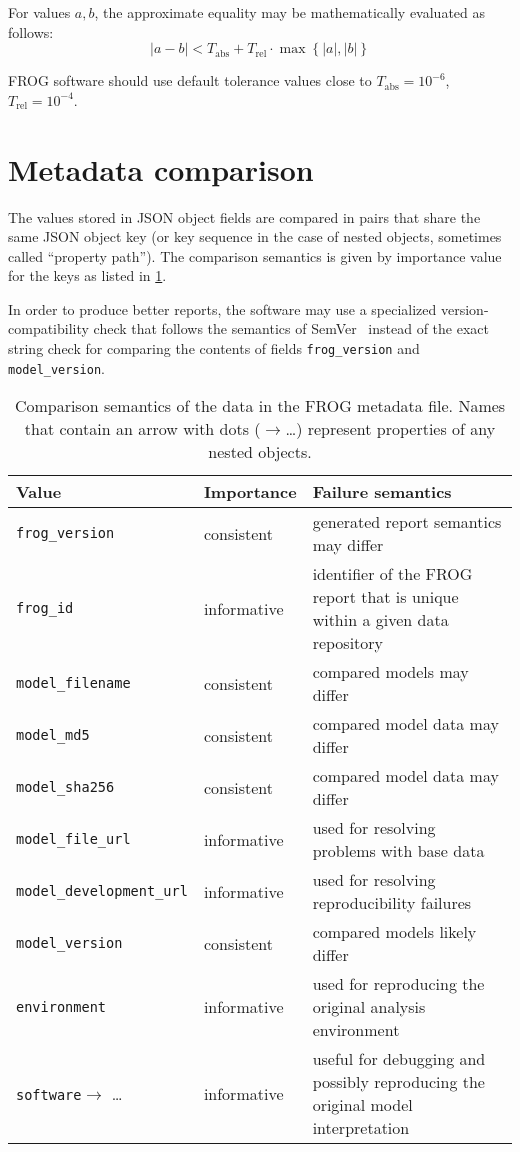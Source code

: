 For values $a, b$, the approximate equality may be mathematically evaluated as follows:
$$|a-b|<T_{\text{abs}} + T_{\text{rel}}\cdot \max\left\{|a|, |b|\right\}$$

FROG software should use default tolerance values close to $T_\text{abs}=10^{-6}$, $T_\text{rel}=10^{-4}$.

\section{Metadata comparison}

The values stored in JSON object fields are compared in pairs that share the same JSON object key (or key sequence in the case of nested objects, sometimes called ``property path'').
The comparison semantics is given by importance value for the keys as listed in \cref{tab:cmpmeta}.

In order to produce better reports, the software may use a specialized version-compatibility check that follows the semantics of SemVer~\cite{semver} instead of the exact string check for comparing the contents of fields \verb|frog_version| and \verb|model_version|.

\begin{table}\tablefont
\begin{tabular}{llp{30em}}
\toprule
Value & Importance & Failure semantics \\
\midrule
\verb|frog_version|
 & consistent
 & generated report semantics may differ
 \\
\verb|frog_id|
 & informative
 & identifier of the FROG report that is unique within a given data repository
 \\
\verb|model_filename|
 & consistent
 & compared models may differ
 \\
\verb|model_md5|
 & consistent
 & compared model data may differ
 \\
\verb|model_sha256|
 & consistent
 & compared model data may differ
 \\
\verb|model_file_url|
 & informative
 & used for resolving problems with base data
 \\
\verb|model_development_url|
 & informative
 & used for resolving reproducibility failures
 \\
\verb|model_version|
 & consistent
 & compared models likely differ
 \\
\verb|environment|
 & informative
 & used for reproducing the original analysis environment
 \\
\verb|software|$\to$ \dots
 & informative
 & useful for debugging and possibly reproducing the original model interpretation
 \\
\bottomrule
\end{tabular}
\caption[Comparison semantics of the FROG metadata file.]{Comparison semantics of the data in the FROG metadata file. Names that contain an arrow with dots ($\to$\dots) represent properties of any nested objects.}
\label{tab:cmpmeta}
\end{table}

